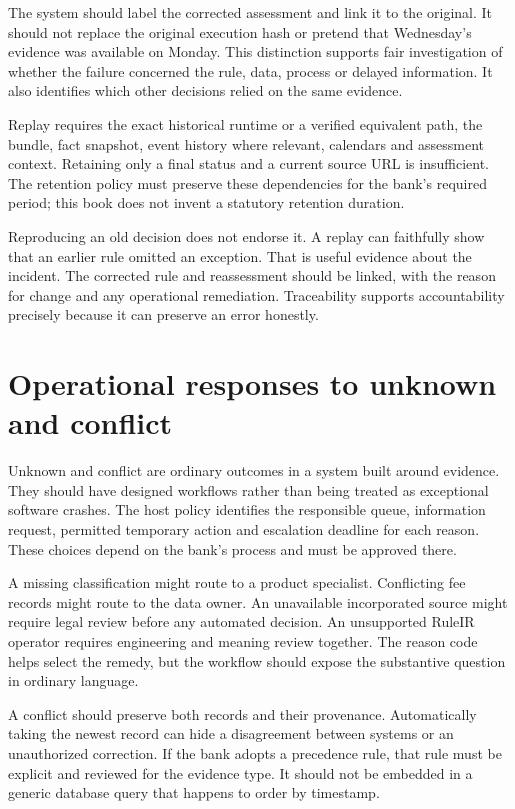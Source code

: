 \documentclass[12pt,a4paper,oneside,openany]{book}
\begin{document}
The system should label the corrected assessment and link it to the original.
It should not replace the original execution hash or pretend that Wednesday's
evidence was available on Monday. This distinction supports fair investigation
of whether the failure concerned the rule, data, process or delayed information.
It also identifies which other decisions relied on the same evidence.

Replay requires the exact historical runtime or a verified equivalent path, the
bundle, fact snapshot, event history where relevant, calendars and assessment
context. Retaining only a final status and a current source URL is insufficient.
The retention policy must preserve these dependencies for the bank's required
period; this book does not invent a statutory retention duration.

Reproducing an old decision does not endorse it. A replay can faithfully show that
an earlier rule omitted an exception. That is useful evidence about the incident.
The corrected rule and reassessment should be linked, with the reason for change
and any operational remediation. Traceability supports accountability precisely
because it can preserve an error honestly.

\section{Operational responses to unknown and conflict}

Unknown and conflict are ordinary outcomes in a system built around evidence.
They should have designed workflows rather than being treated as exceptional
software crashes. The host policy identifies the responsible queue, information
request, permitted temporary action and escalation deadline for each reason.
These choices depend on the bank's process and must be approved there.

A missing classification might route to a product specialist. Conflicting fee
records might route to the data owner. An unavailable incorporated source might
require legal review before any automated decision. An unsupported RuleIR operator
requires engineering and meaning review together. The reason code helps select
the remedy, but the workflow should expose the substantive question in ordinary
language.

A conflict should preserve both records and their provenance. Automatically taking
the newest record can hide a disagreement between systems or an unauthorized
correction. If the bank adopts a precedence rule, that rule must be explicit and
reviewed for the evidence type. It should not be embedded in a generic database
query that happens to order by timestamp.
\end{document}
